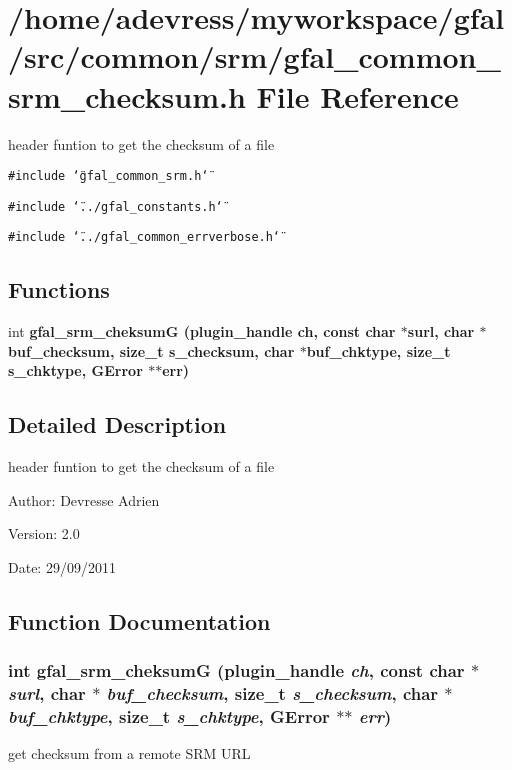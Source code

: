 \section{/home/adevress/myworkspace/gfal/src/common/srm/gfal\_\-common\_\-srm\_\-checksum.h File Reference}
\label{gfal__common__srm__checksum_8h}
header funtion to get the checksum of a file 

{\tt \#include \char`\"{}gfal\_\-common\_\-srm.h\char`\"{}}\par
{\tt \#include \char`\"{}../gfal\_\-constants.h\char`\"{}}\par
{\tt \#include \char`\"{}../gfal\_\-common\_\-errverbose.h\char`\"{}}\par
\subsection*{Functions}
\begin{CompactItemize}
\item 
int \bf{gfal\_\-srm\_\-cheksum\-G} (plugin\_\-handle ch, const char $\ast$surl, char $\ast$buf\_\-checksum, size\_\-t s\_\-checksum, char $\ast$buf\_\-chktype, size\_\-t s\_\-chktype, GError $\ast$$\ast$err)
\end{CompactItemize}


\subsection{Detailed Description}
header funtion to get the checksum of a file 

\begin{Desc}
\item[Author:]Devresse Adrien \end{Desc}
\begin{Desc}
\item[Version:]2.0 \end{Desc}
\begin{Desc}
\item[Date:]29/09/2011 \end{Desc}


\subsection{Function Documentation}
\subsubsection{\setlength{\rightskip}{0pt plus 5cm}int gfal\_\-srm\_\-cheksum\-G (plugin\_\-handle {\em ch}, const char $\ast$ {\em surl}, char $\ast$ {\em buf\_\-checksum}, size\_\-t {\em s\_\-checksum}, char $\ast$ {\em buf\_\-chktype}, size\_\-t {\em s\_\-chktype}, GError $\ast$$\ast$ {\em err})}\label{gfal__common__srm__checksum_8h_e65ec03caef1b84a84b4689991aa1eb2}


get checksum from a remote SRM URL 